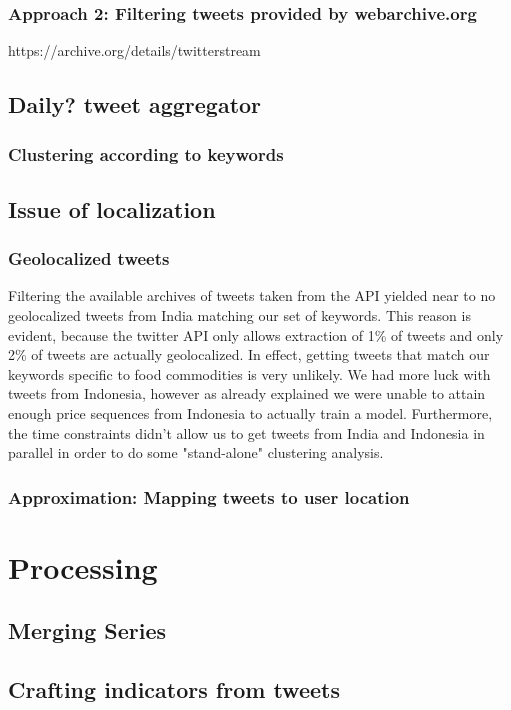 \subsubsection*{Approach 2: Filtering tweets provided by webarchive.org}
https://archive.org/details/twitterstream

\subsection*{Daily? tweet aggregator}

\subsubsection*{Clustering according to keywords}

\subsection*{Issue of localization}

\subsubsection*{Geolocalized tweets}
Filtering the available archives of tweets taken from the API yielded near to no geolocalized tweets from India matching our set of keywords. This reason is evident, because the twitter API only allows extraction of 1\% of tweets and only 2\% of tweets are actually geolocalized. In effect, getting tweets that match our keywords specific to food commodities is very unlikely. We had more luck with tweets from Indonesia, however as already explained we were unable to attain enough price sequences from Indonesia to actually train a model. Furthermore, the time constraints didn't allow us to get tweets from India and Indonesia in parallel in order to do some "stand-alone" clustering analysis.

\subsubsection*{Approximation: Mapping tweets to user location}


\section*{Processing}

\subsection*{Merging Series}

\subsection*{Crafting indicators from tweets}
